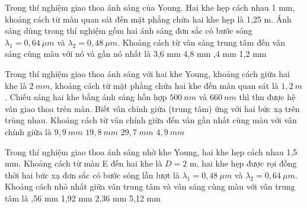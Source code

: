 \setcounter{paragraph}{0}
\setcounter{ex}{0}
\PhanI

\begin{ex}%
Trong thí nghiệm giao thoa ánh sáng của Young. Hai khe hẹp cách nhau 1 mm, khoảng cách từ màn quan sát đến mặt phẳng chứa hai khe hẹp là 1,25 m. Ánh sáng dùng trong thí nghiệm gồm hai ánh sáng đơn sắc có bước sóng $\lambda_1 = 0,64\ \mu m$ và $\lambda_2 = 0,48 \ \mu m$. Khoảng cách từ vân sáng trung tâm đến vân sáng cùng màu với nó và gần nó nhất là
\choice
{3,6 mm}
{4,8 mm}
{,4 mm}
{1,2 mm}

\end{ex} 
\begin{ex}
Trong thí nghiệm giao thoa ánh sáng với hai khe Young, khoảng cách giữa hai khe là $2\ mm$, khoảng cách từ mặt phẳng chứa hai khe đến màn quan sát là $1,2\ m$. Chiếu sáng hai khe bằng ánh sáng hỗn hợp $500\ nm$ và $660\ nm$ thì thu được hệ vân giao thoa trên màn. Biết vân chính giữa (trung tâm) ứng với hai bức xạ trên trùng nhau. Khoảng cách từ vân chính giữa đến vân gần nhất cùng màu với vân chính giữa là
\choice
{\True $9,9\ mm$}
{$19,8\ mm$}
{$29,7\ mm$}
{$4,9\ mm$}
\loigiai{}
\end{ex}
\begin{ex}%
Trong thí nghiệm giao thoa ánh sáng nhờ khe Young, hai khe hẹp cách nhau 1,5 mm. Khoảng cách từ màn E đến hai khe là $D = 2$ m, hai khe hẹp được rọi đồng thời hai bức xạ đơn sắc có bước sóng lần lượt là $\lambda_1=0,48\ \mu m $ và $\lambda_2=0,64\ \mu m $. Khoảng cách nhỏ nhất giữa vân trung tâm và vân sáng cùng màu với vân trung tâm là
\choice
{,56 mm}
{1,92 mm}
{2,36 mm}
{5,12 mm}
\end{ex} 


